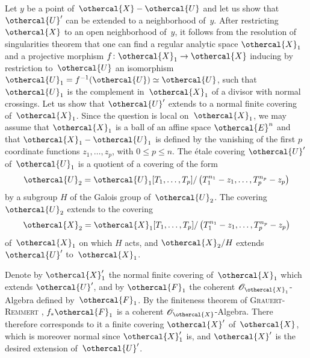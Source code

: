 Let $y$ be a point of~$\othercal{X}-\othercal{U}$ and let us show that
$\othercal{U}'$ can be extended to a neighborhood of~$y$. After
restricting $\othercal{X}$ to an open neighborhood of~$y$, it
follows from the resolution of singularities theorem
\cite{XII.8} that one can find a regular analytic space
$\othercal{X}_1$ and a projective morphism $f\colon\othercal{X}_1\to\othercal{X}$
inducing by restriction to~$\othercal{U}$ an isomorphism
$\othercal{U}_1=f^{-1}(\othercal{U})\simeq\othercal{U}$, such that $\othercal{U}_1$ is
the complement in~$\othercal{X}_1$ of a divisor with
normal crossings. Let us show that $\othercal{U}'$ extends to a
normal finite covering of~$\othercal{X}_1$. Since the question is
local on~$\othercal{X}_1$, we may assume that $\othercal{X}_1$ is a
ball of an affine space $\othercal{E}^n$ and that $\othercal{X}_1-\othercal{U}_1$
is defined by the vanishing of the first $p$ coordinate
functions
$z_1,\dots,z_p$,
with $0\leq p\leq n$. The \'etale covering $\othercal{U}'$
of~$\othercal{U}_1$ is a quotient of a covering of the form
$$
\othercal{U}_2=\othercal{U}_1[T_1,\dots,T_p]/\left(T_1^{n_1}-z_1,\dots,
T_p^{n_p}-z_p\right)
$$
by a subgroup $H$ of the Galois group of~$\othercal{U}_2$. The
covering $\othercal{U}_2$ extends
to the covering
$$
\othercal{X}_2=\othercal{X}_1[T_1,\dots,T_p]/\left(T_1^{n_1}-z_1,\dots,
T_p^{n_p}-z_p\right)
$$
of~$\othercal{X}_1$ on which $H$ acts, and $\othercal{X}_2/H$ extends
$\othercal{U}'$ to~$\othercal{X}_1$.

Denote by $\othercal{X}_1'$ the normal finite covering of~$\othercal{X}_1$ which
extends $\othercal{U}'$, and by $\othercal{F}_1$ the coherent
$\cal{O}_{\othercal{X}_1}$-Algebra defined
by~$\othercal{F}_1$. By the finiteness theorem of
\textsc{Grauert}-\textsc{Remmert} \hbox{\cite[ th]{XII.4}}, $f_*\othercal{F}_1$ is a
coherent $\cal{O}_{\othercal{X}}$-Algebra. There therefore corresponds to it
a finite covering $\othercal{X}'$ of~$\othercal{X}$, which is moreover
normal since $\othercal{X}_1'$ is, and $\othercal{X}'$ is the desired
extension of~$\othercal{U}'$.


